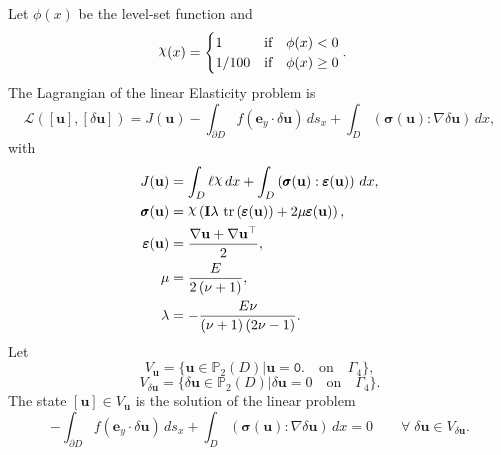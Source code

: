 \documentclass[preview]{standalone}
\let\oldcdot\cdot
\let\cdot\oldcdot
\begin{document}
Let $\phi(x)$ be the level-set function and
 \begin{align*}\raisebox{\depth}{$\chi$}(x) &= \begin{cases} 1 & \mbox{if}\quad \phi(x) < 0 \\ 1/100 & \mbox{if}\quad \phi(x)  \ge 0 \end{cases}.\end{align*}
The Lagrangian of the linear Elasticity problem is
\begin{dmath*}
\mathcal L(\left[ {\mathbf{ u }}\right],\left[ {\delta\mathbf{  u }}\right]) = J({\mathbf{ u }}) -  \int_{\partial D} f \left( \mathbf e_y \cdot {\delta\mathbf{  u }} \right) \,ds_x +  \int_{D} \left( \pmb \sigma({\mathbf{ u }}) \mathrel{:}  \nabla {\delta\mathbf{  u }}  \right) \,dx , 
\end{dmath*}
with 
\begin{align*}
J({\mathbf{ u }}) &=  \int_{D} \ell \raisebox{\depth}{$\chi$} \,dx +  \int_{D} \left( \pmb \sigma({\mathbf{ u }}) \mathrel{:} \pmb \varepsilon({\mathbf{ u }}) \right) \,dx,\\
\pmb \sigma({\mathbf{ u }}) &= \raisebox{\depth}{$\chi$} \left(\mathbf{I} \lambda  \,\operatorname{tr}\left(\pmb \varepsilon({\mathbf{ u }})\right)  + 2 \mu \pmb \varepsilon({\mathbf{ u }})\right),\\
\pmb \varepsilon({\mathbf{ u }}) &= \frac{ \nabla {\mathbf{ u }}  +   \nabla {\mathbf{ u }} ^\top }{2},\\
\mu &= \frac{E}{2 \left(\nu + 1\right)},\\
\lambda &= - \frac{E \nu}{\left(\nu + 1\right) \left(2 \nu - 1\right)}.
 \end{align*}
Let
\begin{equation*}
V_{{\mathbf{ u }}} = \{ {\mathbf{ u }} \in \mathbb P_{2}(D)| {\mathbf{ u }} = \mathtt{\text{0.}}  \quad \text{{on}} \quad\Gamma_{4} \},\end{equation*}
\begin{equation*}
V_{{\delta\mathbf{  u }}} = \{ {\delta\mathbf{  u }} \in \mathbb P_{2}(D)| {\delta\mathbf{  u }} = 0  \quad \text{{on}} \quad\Gamma_{4} \}.\end{equation*}
The state $\left[ {\mathbf{ u }}\right] \in  V_{{\mathbf{ u }}}$ is the solution of the linear problem
\begin{dmath*}
-  \int_{\partial D} f \left( \mathbf e_y \cdot {\delta\mathbf{  u }} \right) \,ds_x +  \int_{D} \left( \pmb \sigma({\mathbf{ u }}) \mathrel{:}  \nabla {\delta\mathbf{  u }}  \right) \,dx = 0\qquad \forall\; {{\delta\mathbf{  u }}\in V_{{\delta\mathbf{  u }}}} . 
\end{dmath*}
\end{document}
